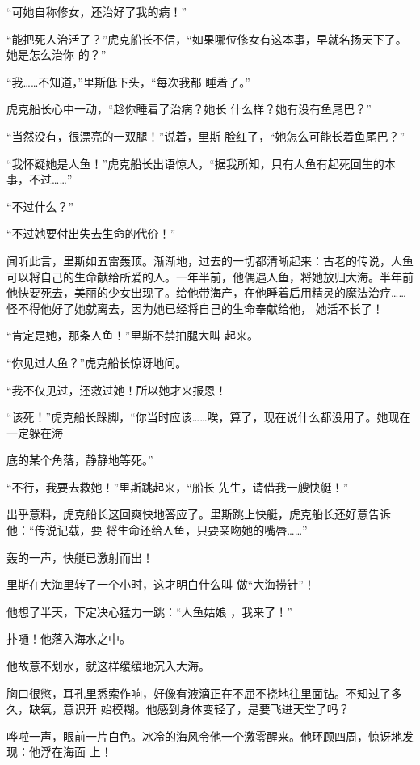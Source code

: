 \documentclass{article}
\begin{document}
“可她自称修女，还治好了我的病！” 

“能把死人治活了？”虎克船长不信，“如果哪位修女有这本事，早就名扬天下了。她是怎么治你
的？” 

“我……不知道，”里斯低下头，“每次我都
睡着了。” 

虎克船长心中一动，“趁你睡着了治病？她长
什么样？她有没有鱼尾巴？” 

“当然没有，很漂亮的一双腿！”说着，里斯
脸红了，“她怎么可能长着鱼尾巴？” 

“我怀疑她是人鱼！”虎克船长出语惊人，“据我所知，只有人鱼有起死回生的本事，不过……”

\newpage


“不过什么？” 


“不过她要付出失去生命的代价！” 

闻听此言，里斯如五雷轰顶。渐渐地，过去的一切都清晰起来：古老的传说，人鱼可以将自己的生命献给所爱的人。一年半前，他偶遇人鱼，将她放归大海。半年前他快要死去，美丽的少女出现了。给他带海产，在他睡着后用精灵的魔法治疗……怪不得他好了她就离去，因为她已经将自己的生命奉献给他，
她活不长了！ 

“肯定是她，那条人鱼！”里斯不禁拍腿大叫
起来。 


“你见过人鱼？”虎克船长惊讶地问。 

“我不仅见过，还救过她！所以她才来报恩！

“该死！”虎克船长跺脚，“你当时应该……唉，算了，现在说什么都没用了。她现在一定躲在海
\newpage

底的某个角落，静静地等死。” 

“不行，我要去救她！”里斯跳起来，“船长
先生，请借我一艘快艇！” 

出乎意料，虎克船长这回爽快地答应了。里斯跳上快艇，虎克船长还好意告诉他：“传说记载，要
将生命还给人鱼，只要亲吻她的嘴唇……” 


轰的一声，快艇已激射而出！ 

里斯在大海里转了一个小时，这才明白什么叫
做“大海捞针”！ 

他想了半天，下定决心猛力一跳：“人鱼姑娘
，我来了！” 


扑嗵！他落入海水之中。 


他故意不划水，就这样缓缓地沉入大海。 

\newpage

胸口很憋，耳孔里悉索作响，好像有液滴正在不屈不挠地往里面钻。不知过了多久，缺氧，意识开
始模糊。他感到身体变轻了，是要飞进天堂了吗？ 

哗啦一声，眼前一片白色。冰冷的海风令他一个激零醒来。他环顾四周，惊讶地发现：他浮在海面
上！ 
\end{document}
